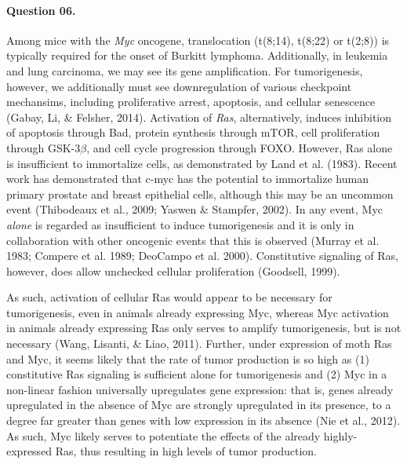 \documentclass[11pt,letterpaper,final] {article}
\begin{document}
\paragraph{Question 06.} Among mice with the \textit{Myc} oncogene, translocation (t(8;14), t(8;22) or t(2;8)) is typically required for the onset of Burkitt lymphoma. Additionally, in leukemia and lung carcinoma, we may see its gene amplification. For tumorigenesis, however, we additionally must see downregulation of various checkpoint mechansims, including proliferative arrest, apoptosis, and cellular senescence (Gabay, Li, \& Felsher, 2014). Activation of \textit{Ras}, alternatively, induces inhibition of apoptosis through Bad, protein synthesis through mTOR, cell proliferation through GSK-3$\beta$, and cell cycle progression through FOXO. However, Ras alone is insufficient to immortalize cells, as demonstrated by Land et al. (1983). Recent work has demonstrated that c-myc has the potential to immortalize human primary prostate and breast epithelial cells, although this may be an uncommon event (Thibodeaux et al., 2009; Yaswen \& Stampfer, 2002). In any event, Myc \textit{alone} is regarded as insufficient to induce tumorigenesis and it is only in collaboration with other oncogenic events that this is observed (Murray et al. 1983; Compere et al. 1989; DeoCampo et al. 2000). Constitutive signaling of Ras, however, does allow unchecked cellular proliferation (Goodsell, 1999).

As such, activation of cellular Ras would appear to be necessary for tumorigenesis, even in animals already expressing Myc, whereas Myc activation in animals already expressing Ras only serves to amplify tumorigenesis, but is not necessary (Wang, Lisanti, \& Liao, 2011). Further, under expression of moth Ras and Myc, it seems likely that the rate of tumor production is so high as (1) constitutive Ras signaling is sufficient alone for tumorigenesis and (2) Myc in a non-linear fashion universally upregulates gene expression: that is, genes already upregulated in the absence of Myc are strongly upregulated in its presence, to a degree far greater than genes with low expression in its absence (Nie et al., 2012). As such, Myc likely serves to potentiate the effects of the already highly-expressed Ras, thus resulting in high levels of tumor production.


% 
% 
\end{document}
